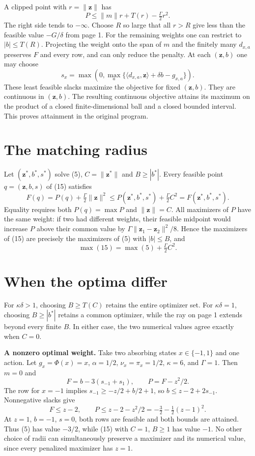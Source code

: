 \documentclass[12pt,a4paper]{article}
\newcommand{\ip}[2]{\langle #1,#2\rangle}
\newcommand{\norm}[1]{\lVert #1\rVert}
\newcommand{\vz}{\mathbf z}
\newcommand{\lead}[1]{\par\smallskip\textbf{#1}\enspace}
\begin{document}
A clipped point with $r=\norm{\vz}$ has
\[
 P\le \norm{m}r+T(r)-\tfrac{\Gamma}{2}r^2.
\]
The right side tends to $-\infty$. Choose $R$ so large that all $r>R$
give less than the feasible value $-G/\delta$ from page 1. For the remaining
weights one can restrict to $|b|\le T(R)$. Projecting the weight onto the
span of $m$ and the finitely many $d_{x,a}$ preserves $F$ and every row,
and can only reduce the penalty. At each $(\vz,b)$ one may choose
\[
 s_x=\max\!\left(0,\max_a\{\ip{d_{x,a}}{\vz}+\delta b-g_{x,a}\}\right).
\]
These least feasible slacks maximize the objective for fixed $(\vz,b)$.
They are continuous in $(\vz,b)$. The resulting continuous objective attains
its maximum on the product of a closed finite-dimensional ball and a closed
bounded interval. This proves attainment in the original program.

\section*{The matching radius}
Let $(\vz^*,b^*,s^*)$ solve (5), $C=\norm{\vz^*}$ and $B\ge|b^*|$.
Every feasible point $q=(\vz,b,s)$ of (15) satisfies
\[
 F(q)=P(q)+\tfrac{\Gamma}{2}\norm{\vz}^2
 \le P(\vz^*,b^*,s^*)+\tfrac{\Gamma}{2}C^2=F(\vz^*,b^*,s^*).
\]
Equality requires both $P(q)=\max P$ and $\norm{\vz}=C$. All maximizers
of $P$ have the same weight: if two had different weights, their feasible
midpoint would increase $P$ above their common value by
$\Gamma\norm{\vz_1-\vz_2}^2/8$. Hence the maximizers of (15) are precisely
the maximizers of (5) with $|b|\le B$, and
\[
 \boxed{\quad \max (15)=\max (5)+\tfrac{\Gamma}{2}C^2.\quad}
\]

\newpage
\section*{When the optima differ}
For $\kappa\delta>1$, choosing $B\ge T(C)$ retains the entire optimizer
set. For $\kappa\delta=1$, choosing $B\ge|b^*|$ retains a common optimizer,
while the ray on page 1 extends beyond every finite $B$. In either case,
the two numerical values agree exactly when $C=0$.

\lead{A nonzero optimal weight.}
Take two absorbing states $x\in\{-1,1\}$ and one action. Let
$g_x=\Phi(x)=x$, $\alpha=1/2$, $\nu_x=\pi_x=1/2$, $\kappa=6$, and
$\Gamma=1$. Then $m=0$ and
\[
 F=b-3(s_{-1}+s_1),\qquad P=F-z^2/2.
\]
The row for $x=-1$ implies $s_{-1}\ge -z/2+b/2+1$, so
$b\le z-2+2s_{-1}$. Nonnegative slacks give
\[
 F\le z-2,\qquad
 P\le z-2-z^2/2=-\tfrac32-\tfrac12(z-1)^2.
\]
At $z=1$, $b=-1$, $s=0$, both rows are feasible and both bounds are
attained. Thus (5) has value $-3/2$, while (15) with $C=1$, $B\ge1$
has value $-1$. No other choice of radii can simultaneously preserve a
maximizer and its numerical value, since every penalized maximizer has $z=1$.
\end{document}
